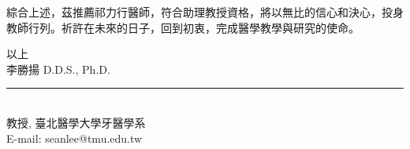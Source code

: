 \documentclass{letter}
\begin{document}
\begin{letter}

綜合上述，茲推薦祁力行醫師，符合助理教授資格，將以無比的信心和決心，投身教師行列。祈許在未來的日子，回到初衷，完成醫學教學與研究的使命。

\medskip
以上 \\ 
李勝揚 D.D.S., Ph.D.\hspace{3mm} \rule[-1mm]{3cm}{0.15mm} \\%
教授, 臺北醫學大學牙醫學系\\
E-mail: seanlee@tmu.edu.tw\\[0.5cm]





\clearpage

%


\end{letter}
\end{document}
